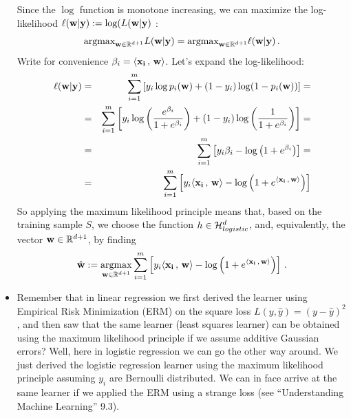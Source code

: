 \begin{itemize}
      Since the $\log$ function is monotone increasing, we can maximize the
      log-likelihood $\ell(\mathbf{w} | \mathbf{y}) := \log( L(\mathbf{w} | \mathbf{y})$ :
      \[
	\text{argmax}_{\mathbf{w}\in\mathbb{R}^{d+1}} L(\mathbf{w} | \mathbf{y})  = 
	\text{argmax}_{\mathbf{w}\in\mathbb{R}^{d+1}} \ell(\mathbf{w} | \mathbf{y})\,.
      \]
      Write for convenience $\beta_i = {\left\langle \mathbf{x_i}\,,\,\mathbf{w} \right\rangle}$. Let's expand
      the log-likelihood:
      \begin{eqnarray*}
	\ell(\mathbf{w} | \mathbf{y}) & = & \sum_{i=1}^m \left[ y_i \log p_i(\mathbf{w}) +
	(1-y_i)\log(1-p_i(\mathbf{w})) \right] = \\
	&=& \sum_{i=1}^m \left[ y_i \log \left(\frac{e^{\beta_i}}{1+e^{\beta_i}}\right)
	+(1-y_i) \log \left(\frac{1}{1+e^{\beta_i}}\right) \right] = \\
      &=& \sum_{i=1}^m \left[ y_i \beta_i - \log
      \left(1+e^{\beta_i}\right)\right] = \\
    &=& \sum_{i=1}^m \left[y_i {\left\langle \mathbf{x_i}\,,\,\mathbf{w} \right\rangle} - \log
    \left(1+e^{{\left\langle \mathbf{x_i}\,,\,\mathbf{w} \right\rangle}}\right) \right]
      \end{eqnarray*}
      So applying the maximum likelihood principle means that, based on the
      training sample
      $S$, we choose the function  $h\in \mathcal{H}_{logistic}^d$, and, equivalently, the vector 
      $\mathbf{w}\in\mathbb{R}^{d+1}$, by finding
    \[
      \hat{\mathbf{w}} := 
      \operatorname*{argmax}_{\mathbf{w}\in\mathbb{R}^{d+1}}  
      \sum_{i=1}^m \left[ y_i {\left\langle \mathbf{x_i}\,,\,\mathbf{w} \right\rangle} - \log
      \left(1+e^{{\left\langle \mathbf{x_i}\,,\,\mathbf{w} \right\rangle}}\right) \right]\,.
    \]
  \item Remember that in linear regression we first derived the learner using
    Empirical Risk Minimization (ERM) on the square loss
    $L(y,\hat{y})=(y-\hat{y})^2$, and then saw that the
    same learner (least squares learner) 
    can be obtained using the maximum likelihood principle if we assume additive Gaussian
    errors? Well, here in logistic regression we can go the other way around.
    We just derived the logistic regression learner using the maximum likelihood
    principle assuming $y_i$ are Bernoulli distributed. We can in face arrive at
    the same learner if we applied the ERM using a strange
    loss (see ``Understanding Machine Learning'' 9.3).
  \end{itemize}
